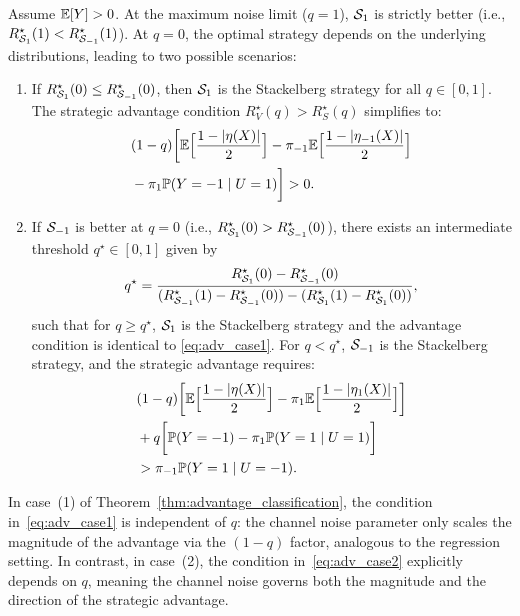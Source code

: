 \begin{theorem} \label{thm:advantage_classification}
Assume $\mathbb{E}[Y] > 0$. At the maximum noise limit ($q=1$), $\mathcal{S}_1$ is strictly better (i.e., $R_{\mathcal{S}_1}^\star(1) < R_{\mathcal{S}_{-1}}^\star(1)$). At $q=0$, the optimal strategy depends on the underlying distributions, leading to two possible scenarios:
\begin{enumerate}
    \item If $R_{\mathcal{S}_1}^\star(0) \le R_{\mathcal{S}_{-1}}^\star(0)$, then $\mathcal{S}_1$ is the Stackelberg strategy for all $q \in [0, 1]$. The strategic advantage condition $R_V^\star(q) > R_S^\star(q)$ simplifies to:
    \begin{align}
        &(1-q) \biggl[ \mathbb{E}\Big[\frac{1-|\eta(X)|}{2}\Big] - \pi_{-1}\mathbb{E}\Big[\frac{1-|\eta_{-1}(X)|}{2}\Big] \nonumber \\
        &- \pi_1 \mathbb{P}(Y=-1 \mid U=1) \biggr] > 0. \label{eq:adv_case1}
    \end{align}
    \item If $\mathcal{S}_{-1}$ is better at $q=0$ (i.e., $R_{\mathcal{S}_1}^\star(0) > R_{\mathcal{S}_{-1}}^\star(0)$), there exists an intermediate threshold $q^\star \in [0, 1]$ given by 
    \begin{align}
    q^\star = \frac{R_{\mathcal{S}_1}^\star(0) - R_{\mathcal{S}_{-1}}^\star(0)}{(R_{\mathcal{S}_{-1}}^\star(1) - R_{\mathcal{S}_{-1}}^\star(0)) - (R_{\mathcal{S}_1}^\star(1) - R_{\mathcal{S}_1}^\star(0))},
    \end{align}
    such that for $q \ge q^\star$, $\mathcal{S}_1$ is the Stackelberg strategy and the advantage condition is identical to \eqref{eq:adv_case1}. For $q < q^\star$, $\mathcal{S}_{-1}$ is the Stackelberg strategy, and the strategic advantage requires:
    \begin{align}
        &(1-q)\biggl[\mathbb{E}\Big[\frac{1-|\eta(X)|}{2}\Big] - \pi_1\mathbb{E}\Big[\frac{1-|\eta_1(X)|}{2}\Big]\biggr] \nonumber \\
        &+ q\biggl[\mathbb{P}(Y=-1) - \pi_1\mathbb{P}(Y=1 \mid U=1)\biggr] \nonumber \\
        &> \pi_{-1}\mathbb{P}(Y=1 \mid U=-1). \label{eq:adv_case2}
    \end{align}
\end{enumerate}
\end{theorem}

\begin{remark}
In case~(1) of Theorem~\ref{thm:advantage_classification}, the condition in~\eqref{eq:adv_case1} is independent of $q$: the channel noise parameter only scales the magnitude of the advantage via the $(1-q)$ factor, analogous to the regression setting. In contrast, in case~(2), the condition in~\eqref{eq:adv_case2} explicitly depends on $q$, meaning the channel noise governs both the magnitude and the direction of the strategic advantage.
\end{remark}

